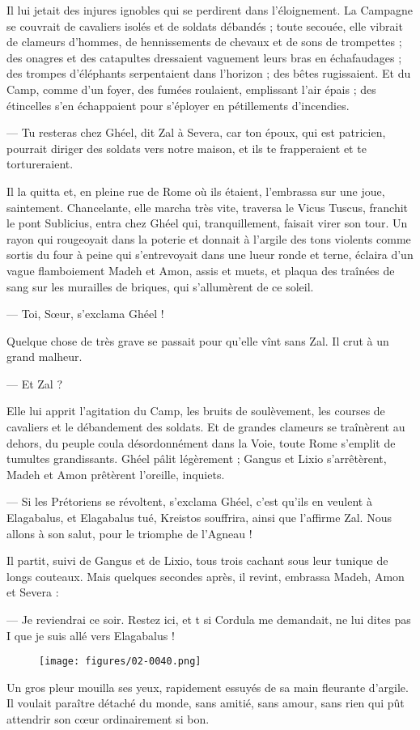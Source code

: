 \documentclass[a4paper, 11pt, oneside, polutonikogreek, french]{article}
\begin{document}
Il lui jetait des injures ignobles qui se perdirent dans l’éloignement. La Campagne se couvrait de cavaliers isolés et de soldats débandés ; toute secouée, elle vibrait de clameurs d'hommes, de hennissements de chevaux et de sons de trompettes ; des onagres et des catapultes dressaient vaguement leurs bras en échafaudages ; des trompes d'éléphants serpentaient dans l'horizon ; des bêtes rugissaient. Et du Camp, comme d'un foyer, des fumées roulaient, emplissant l'air épais ; des étincelles s'en échappaient pour s'éployer en pétillements d'incendies.

--- Tu resteras chez Ghéel, dit Zal à Severa, car ton époux, qui est patricien, pourrait diriger des soldats vers notre maison, et ils te frapperaient et te tortureraient.

Il la quitta et, en pleine rue de Rome où ils étaient, l'embrassa sur une joue, saintement. Chancelante, elle marcha très vite, traversa le Vicus Tuscus, franchit le pont Sublicius, entra chez Ghéel qui, tranquillement, faisait virer son tour. Un rayon qui rougeoyait dans la poterie et donnait à l'argile des tons violents comme sortis du four à peine qui s'entrevoyait dans une lueur ronde et terne, éclaira d'un vague flamboiement Madeh et Amon, assis et muets, et plaqua des traînées de sang sur les murailles de briques, qui s'allumèrent de ce soleil.

--- Toi, Sœur, s'exclama Ghéel !

Quelque chose de très grave se passait pour qu'elle vînt sans Zal. Il crut à un grand malheur.

--- Et Zal ?

Elle lui apprit l'agitation du Camp, les bruits de soulèvement, les courses de cavaliers et le débandement des soldats. Et de grandes clameurs se traînèrent au dehors, du peuple coula désordonnément dans la Voie, toute Rome s'emplit de tumultes grandissants. Ghéel pâlit légèrement ; Gangus et Lixio s'arrêtèrent, Madeh et Amon prêtèrent l'oreille, inquiets.

--- Si les Prétoriens se révoltent, s'exclama Ghéel, c'est qu'ils en veulent à Elagabalus, et Elagabalus tué, Kreistos souffrira, ainsi que l'affirme Zal. Nous allons à son salut, pour le triomphe de l'Agneau !

Il partit, suivi de Gangus et de Lixio, tous trois cachant sous leur tunique de longs couteaux. Mais quelques secondes après, il revint, embrassa Madeh, Amon et Severa :

--- Je reviendrai ce soir. Restez ici, et t si Cordula me demandait, ne lui dites pas I que je suis allé vers Elagabalus !
\begin{figure}[H]
\centering
\texttt{[image: figures/02-0040.png]}
\end{figure}
Un gros pleur mouilla ses yeux, rapidement essuyés de sa main fleurante d'argile. Il voulait paraître détaché du monde, sans amitié, sans amour, sans rien qui pût attendrir son cœur ordinairement si bon.
\end{document}
